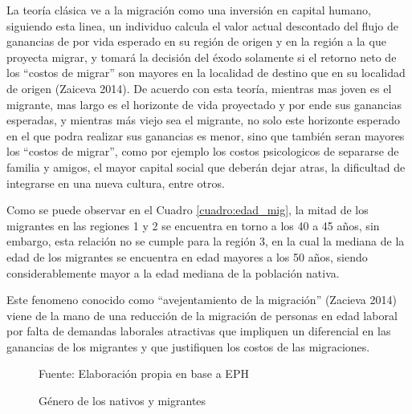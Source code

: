 \documentclass[12pt,a4paper]{article}
\newcommand{\source}[1]{\caption*{\scriptsize{Fuente: {#1}}} }
\begin{document}
La teoría clásica ve a la migración como una inversión en capital humano, siguiendo esta linea, un individuo calcula el valor actual descontado del flujo de ganancias de por vida esperado en su región de origen y en la región a la que proyecta migrar, y tomará la decisión del éxodo solamente si el retorno neto de los ``costos de migrar'' son mayores en la localidad de destino que en su localidad de origen (Zaiceva 2014). De acuerdo con esta teoría, mientras mas joven es el migrante, mas largo es el horizonte de vida proyectado y por ende sus ganancias esperadas, y mientras más viejo sea el migrante, no solo este horizonte esperado en el que podra realizar sus ganancias es menor, sino que también seran mayores  los ``costos de migrar'', como por ejemplo los costos psicologicos de separarse de familia y amigos, el mayor capital social que deberán dejar atras, la dificultad de integrarse en una nueva cultura, entre otros.

Como se puede observar en el Cuadro \ref{cuadro:edad_mig}, la mitad de los migrantes en las regiones 1 y 2 se encuentra en torno a los 40 a 45 años, sin embargo, esta relación no se cumple para la región 3, en la cual la mediana de la edad de los migrantes se encuentra en edad mayores a los 50 años, siendo considerablemente mayor a la edad mediana de la población nativa.

Este fenomeno conocido como ``avejentamiento de la migración'' (Zacieva 2014) viene de la mano de una reducción de la migración de personas en edad laboral por falta de demandas laborales atractivas que impliquen un diferencial en las ganancias de los migrantes y que justifiquen los costos de las migraciones.
\begin{figure}[ht!]
\begin{center}
 
\caption{Género de los nativos y migrantes}
\label{figure:edad_mig}
\source{Elaboración propia en base a EPH}
\end{center}
\end{figure}
\end{document}
